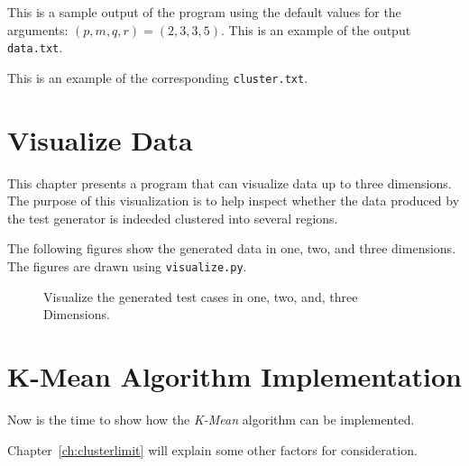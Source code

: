 This is a sample output of the program using the default values for
the arguments: $(p, m, q, r) = (2, 3, 3, 5)$.
This is an example of the output {\tt data.txt}.

\resetlinenumber[1]
\linenumbers
\begin{tt}
  
\end{tt}
\nolinenumbers

This is an example of the corresponding {\tt cluster.txt}.

\resetlinenumber[1]
\linenumbers
\begin{tt}
  
\end{tt}
\nolinenumbers

\section{Visualize Data}


This chapter presents a program that can visualize data up to three
dimensions.  The purpose of this visualization is to help inspect
whether the data produced by the test generator is indeeded clustered
into several regions.

\resetlinenumber[1]
\linenumbers
\begin{tt}
  
\end{tt}
\nolinenumbers


The following figures show the generated data in one, two, and three
dimensions.  The figures are drawn using {\tt visualize.py}.


\clearpage

\begin{figure}[h] \centering
\caption{Visualize the generated test cases in one, two, and, three
  Dimensions. }
\label{fig:kmean:visualize}
\end{figure}

\clearpage

\section{K-Mean Algorithm Implementation}

Now is the time to show how the {\it K-Mean} algorithm
can be implemented.

Chapter~\ref{ch:clusterlimit}
will explain some other factors for consideration.
